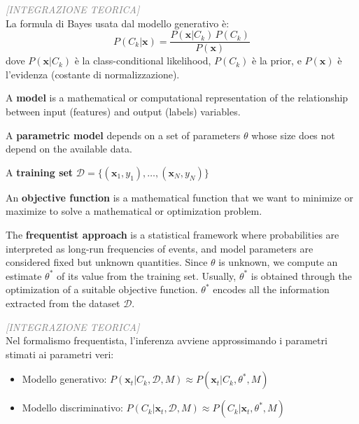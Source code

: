 \begin{tcolorbox}[colframe=blue!70!black, colback=white, sharp corners=southwest, left=2mm, boxrule=1pt, enhanced, breakable]
\textcolor{gray}{\footnotesize\textit{[INTEGRAZIONE TEORICA]}}\\
La formula di Bayes usata dal modello generativo è:
\begin{equation*}
P(C_k|\mathbf{x}) = \frac{P(\mathbf{x}|C_k)\,P(C_k)}{P(\mathbf{x})}
\end{equation*}
dove $P(\mathbf{x}|C_k)$ è la class-conditional likelihood, $P(C_k)$ è la prior, e $P(\mathbf{x})$ è l'evidenza (costante di normalizzazione).
\end{tcolorbox}

A \textbf{model} is a mathematical or computational representation of the relationship between input (features) and output (labels) variables.

A \textbf{parametric model} depends on a set of parameters $\theta$ whose size does not depend on the available data.

A \textbf{training set} $\mathcal{D} = \{(\mathbf{x}_1, y_1), \ldots, (\mathbf{x}_N, y_N)\}$

An \textbf{objective function} is a mathematical function that we want to minimize or maximize to solve a mathematical or optimization problem.

The \textbf{frequentist approach} is a statistical framework where probabilities are interpreted as long-run frequencies of events, and model parameters are considered fixed but unknown quantities.
Since $\theta$ is unknown, we compute an estimate $\theta^*$ of its value from the training set. Usually, $\theta^*$ is obtained through the optimization of a suitable objective function.
$\theta^*$ encodes all the information extracted from the dataset $\mathcal{D}$.

\begin{tcolorbox}[colframe=blue!70!black, colback=white, sharp corners=southwest, left=2mm, boxrule=1pt, enhanced, breakable]
\textcolor{gray}{\footnotesize\textit{[INTEGRAZIONE TEORICA]}}\\
Nel formalismo frequentista, l'inferenza avviene approssimando i parametri stimati ai parametri veri:
\begin{itemize}
\item Modello generativo: $P(\mathbf{x}_t|C_k, \mathcal{D}, M) \approx P(\mathbf{x}_t|C_k, \theta^*, M)$
\item Modello discriminativo: $P(C_k|\mathbf{x}_t, \mathcal{D}, M) \approx P(C_k|\mathbf{x}_t, \theta^*, M)$
\end{itemize}
\end{tcolorbox}

